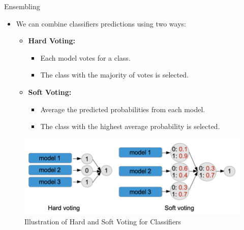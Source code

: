 \documentclass[10pt]{beamer}
\theoremstyle{remark}
\theoremstyle{definition}
\begin{document}
\begin{frame}{Ensembling}
\begin{itemize}
\item We can combine classifiers predictions using two ways:
\begin{itemize}
    \item \textbf{Hard Voting:}
    \begin{itemize}
        \item Each model votes for a class.
        \item The class with the majority of votes is selected.
    \end{itemize}
    \item \textbf{Soft Voting:}
    \begin{itemize}
        \item Average the predicted probabilities from each model.
        \item The class with the highest average probability is selected.
    \end{itemize}
\end{itemize}
\end{itemize}
\begin{figure}
    \centering
    \includegraphics[width=0.8\linewidth]{./images/voting.png}
    \caption{Illustration of Hard and Soft Voting for Classifiers}
\end{figure}
\end{frame}
\end{document}
